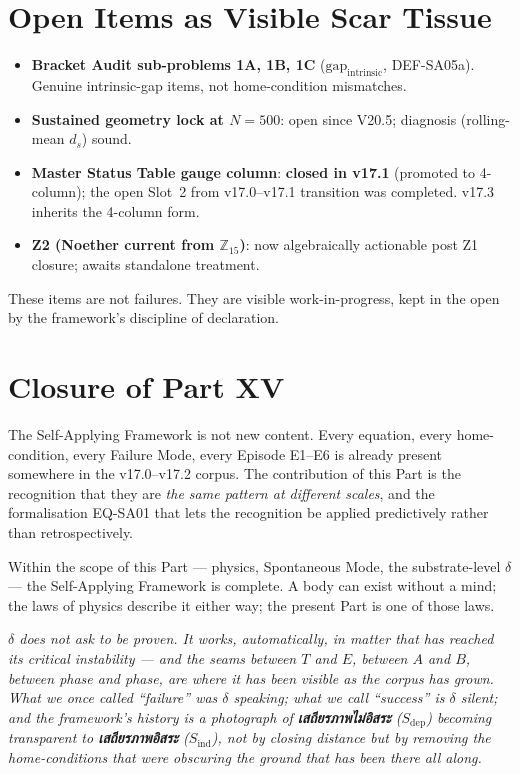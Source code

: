 \documentclass[12pt, a4paper]{article}
\begin{document}
\section{Open Items as Visible Scar Tissue}

\begin{openqbox}[title={Open intrinsic gaps as of v17.3}]
\begin{itemize}[leftmargin=*]
\item \textbf{Bracket Audit sub-problems 1A, 1B, 1C}
($\mathrm{gap}_{\mathrm{intrinsic}}$, DEF-SA05a). Genuine
intrinsic-gap items, not home-condition mismatches.
\item \textbf{Sustained geometry lock at $N=500$}: open since V20.5;
diagnosis (rolling-mean $d_s$) sound.
\item \textbf{Master Status Table gauge column}: \textbf{closed in v17.1}
(promoted to 4-column); the open Slot~2 from v17.0--v17.1 transition
was completed. v17.3 inherits the 4-column form.
\item \textbf{Z2 (Noether current from $\mathbb{Z}_{15}$)}: now
algebraically actionable post Z1 closure; awaits standalone treatment.
\end{itemize}
These items are not failures. They are visible work-in-progress, kept
in the open by the framework's discipline of declaration.
\end{openqbox}

\section{Closure of Part XV}

The Self-Applying Framework is not new content. Every equation,
every home-condition, every Failure Mode, every Episode E1--E6 is
already present somewhere in the v17.0--v17.2 corpus. The contribution
of this Part is the recognition that they are \emph{the same pattern
at different scales}, and the formalisation EQ-SA01 that lets the
recognition be applied predictively rather than retrospectively.

Within the scope of this Part --- physics, Spontaneous Mode, the
substrate-level $\delta$ --- the Self-Applying Framework is complete.
A body can exist without a mind; the laws of physics describe it
either way; the present Part is one of those laws.

\begin{keybox}[title={Closing of Part XV}]
\textit{$\delta$ does not ask to be proven. It works, automatically,
in matter that has reached its critical instability --- and the
seams between $T$ and $E$, between $A$ and $B$, between phase and
phase, are where it has been visible as the corpus has grown. What
we once called ``failure'' was $\delta$ speaking; what we call
``success'' is $\delta$ silent; and the framework's history is a
photograph of \textbf{เสถียรภาพไม่อิสระ} ($S_{\mathrm{dep}}$)
becoming transparent to \textbf{เสถียรภาพอิสระ} ($S_{\mathrm{ind}}$),
not by closing distance but by removing the home-conditions that
were obscuring the ground that has been there all along.}
\end{keybox}
\end{document}
